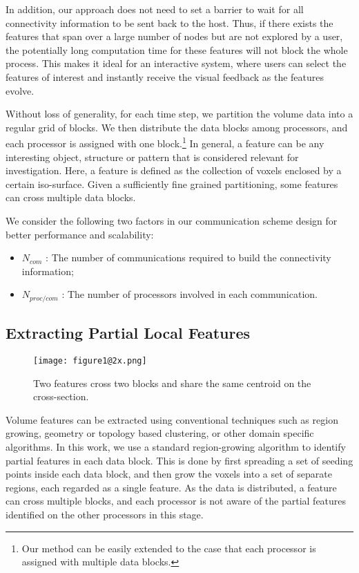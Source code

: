 In addition, our approach does not need to set a barrier to wait for all connectivity information to be sent back to the host. Thus, if there exists the features that span over a large number of nodes but are not explored by a user, the potentially long computation time for these features will not block the whole process. This makes it ideal for an interactive system, where users can select the features of interest and instantly receive the visual feedback as the features evolve.

Without loss of generality, for each time step, we partition the volume data into a regular grid of blocks. We then distribute the data blocks among processors, and each processor is assigned with one block.\footnote{Our method can be easily extended to the case that each processor is assigned with multiple data blocks.} In general, a feature can be any interesting object, structure or pattern that is considered relevant for investigation. Here, a feature is defined as the collection of voxels enclosed by a certain iso-surface. Given a sufficiently fine grained partitioning, some features can cross multiple data blocks.

We consider the following two factors in our communication scheme design for better performance and scalability:

\begin{itemize}
	\item $N_{com}$ : The number of communications required to build the connectivity information;
	\item $N_{proc/com}$ : The number of processors involved in each communication.
\end{itemize} 

\subsection{Extracting Partial Local Features}

\begin{figure}[t]
	\centering
	\texttt{[image: figure1@2x.png]}
	\caption{Two features cross two blocks and share the same centroid on the cross-section.}
	\label{fig:special}
\end{figure}

Volume features can be extracted using conventional techniques such as region growing, geometry or topology based clustering, or other domain specific algorithms. In this work, we use a standard region-growing algorithm\cite{Lohmann1998} to identify partial features in each data block. This is done by first spreading a set of seeding points inside each data block, and then grow the voxels into a set of separate regions, each regarded as a single feature. As the data is distributed, a feature can cross multiple blocks, and each processor is not aware of the partial features identified on the other processors in this stage. 


